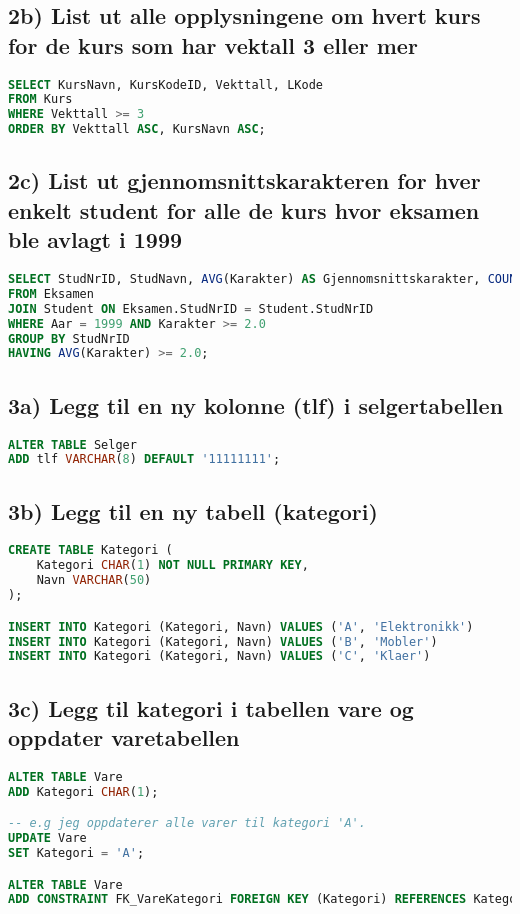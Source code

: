\documentclass{article}
\begin{document}
\subsection*{2b) List ut alle opplysningene om hvert kurs for de kurs som har vektall 3 eller mer}

\begin{lstlisting}[language=SQL]
SELECT KursNavn, KursKodeID, Vekttall, LKode
FROM Kurs
WHERE Vekttall >= 3
ORDER BY Vekttall ASC, KursNavn ASC;
\end{lstlisting}

\subsection*{2c) List ut gjennomsnittskarakteren for hver enkelt student for alle de kurs hvor eksamen ble avlagt i 1999}

\begin{lstlisting}[language=SQL]
SELECT StudNrID, StudNavn, AVG(Karakter) AS Gjennomsnittskarakter, COUNT(KursKodeID) AS AntallKurs
FROM Eksamen
JOIN Student ON Eksamen.StudNrID = Student.StudNrID
WHERE Aar = 1999 AND Karakter >= 2.0
GROUP BY StudNrID
HAVING AVG(Karakter) >= 2.0;
\end{lstlisting}

\subsection*{3a) Legg til en ny kolonne (tlf) i selgertabellen}

\begin{lstlisting}[language=SQL]
ALTER TABLE Selger
ADD tlf VARCHAR(8) DEFAULT '11111111';
\end{lstlisting}

\subsection*{3b) Legg til en ny tabell (kategori)}

\begin{lstlisting}[language=SQL]
CREATE TABLE Kategori (
    Kategori CHAR(1) NOT NULL PRIMARY KEY,
    Navn VARCHAR(50)
);

INSERT INTO Kategori (Kategori, Navn) VALUES ('A', 'Elektronikk')
INSERT INTO Kategori (Kategori, Navn) VALUES ('B', 'Mobler')
INSERT INTO Kategori (Kategori, Navn) VALUES ('C', 'Klaer')
\end{lstlisting}

\subsection*{3c) Legg til kategori i tabellen vare og oppdater varetabellen}

\begin{lstlisting}[language=SQL]
ALTER TABLE Vare
ADD Kategori CHAR(1);

-- e.g jeg oppdaterer alle varer til kategori 'A'.
UPDATE Vare
SET Kategori = 'A';

ALTER TABLE Vare
ADD CONSTRAINT FK_VareKategori FOREIGN KEY (Kategori) REFERENCES Kategori(Kategori);
\end{lstlisting}
\end{document}
